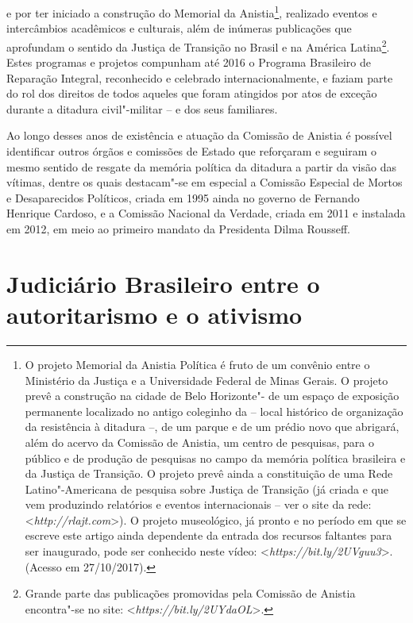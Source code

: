   e por ter iniciado a construção do Memorial
da Anistia\footnote{O projeto Memorial da Anistia Política é fruto de um
  convênio entre o Ministério da Justiça e a Universidade Federal de
  Minas Gerais. O projeto prevê a construção na cidade de Belo
  Horizonte"- de um espaço de exposição permanente localizado no antigo
  coleginho da  -- local histórico de organização da resistência à
  ditadura --, de um parque e de um prédio novo que abrigará, além do acervo da
  Comissão de Anistia, um centro de pesquisas, para o público e de
  produção de pesquisas no campo da memória política brasileira e da
  Justiça de Transição. O projeto prevê ainda a constituição de uma Rede
  Latino"-Americana de pesquisa sobre Justiça de Transição (já criada e
  que vem produzindo relatórios e eventos internacionais -- ver o site da
  rede: \textless{}\emph{http://rlajt.com}\textgreater{}).
  O projeto museológico, já pronto e no
  período em que se escreve este artigo ainda dependente da entrada dos
  recursos faltantes para ser inaugurado, pode ser conhecido neste
  vídeo: \textless{}\emph{https://bit.ly/2UVguu3}\textgreater{}. (Acesso em
  27/10/2017).}, realizado eventos e intercâmbios acadêmicos e
culturais, além de inúmeras publicações que aprofundam o sentido da
Justiça de Transição no Brasil e na América Latina\footnote{Grande parte
  das publicações promovidas pela Comissão de Anistia encontra"-se no
  site: \textless{}\emph{https://bit.ly/2UYdaOL}\textgreater{}.}.
  Estes programas e projetos compunham até 2016 o Programa
Brasileiro de Reparação Integral, reconhecido e celebrado
internacionalmente, e faziam parte do rol dos direitos de todos aqueles
que foram atingidos por atos de exceção durante a ditadura civil"-militar --
e dos seus familiares.

Ao longo desses anos de existência e atuação da Comissão de Anistia é
possível identificar outros órgãos e comissões de Estado que reforçaram
e seguiram o mesmo sentido de resgate da memória política da ditadura a
partir da visão das vítimas, dentre os quais destacam"-se em especial a
Comissão Especial de Mortos e Desaparecidos Políticos, criada em 1995
ainda no governo de Fernando Henrique Cardoso, e a Comissão Nacional da
Verdade, criada em 2011 e instalada em 2012, em meio ao primeiro mandato
da Presidenta Dilma Rousseff.

\section{Judiciário Brasileiro entre o autoritarismo e o ativismo}

